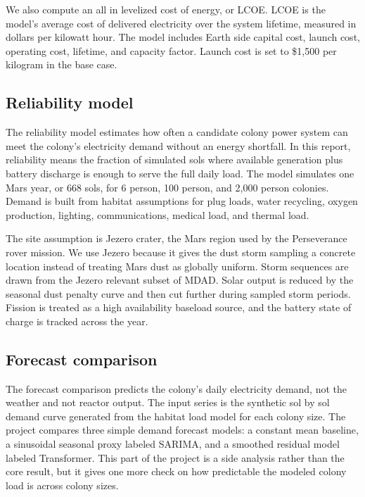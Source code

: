 \documentclass[11pt]{article}
\begin{document}
We also compute an all in levelized cost of energy, or LCOE. LCOE is the model's average cost of delivered electricity over the system lifetime, measured in dollars per kilowatt hour. The model includes Earth side capital cost, launch cost, operating cost, lifetime, and capacity factor. Launch cost is set to \$1{,}500 per kilogram in the base case.

\subsection{Reliability model}

The reliability model estimates how often a candidate colony power system can meet the colony's electricity demand without an energy shortfall. In this report, reliability means the fraction of simulated sols where available generation plus battery discharge is enough to serve the full daily load. The model simulates one Mars year, or 668 sols, for 6 person, 100 person, and 2{,}000 person colonies. Demand is built from habitat assumptions for plug loads, water recycling, oxygen production, lighting, communications, medical load, and thermal load.

The site assumption is Jezero crater, the Mars region used by the Perseverance rover mission. We use Jezero because it gives the dust storm sampling a concrete location instead of treating Mars dust as globally uniform. Storm sequences are drawn from the Jezero relevant subset of MDAD. Solar output is reduced by the seasonal dust penalty curve and then cut further during sampled storm periods. Fission is treated as a high availability baseload source, and the battery state of charge is tracked across the year.

\subsection{Forecast comparison}

The forecast comparison predicts the colony's daily electricity demand, not the weather and not reactor output. The input series is the synthetic sol by sol demand curve generated from the habitat load model for each colony size. The project compares three simple demand forecast models: a constant mean baseline, a sinusoidal seasonal proxy labeled SARIMA, and a smoothed residual model labeled Transformer. This part of the project is a side analysis rather than the core result, but it gives one more check on how predictable the modeled colony load is across colony sizes.
\end{document}
